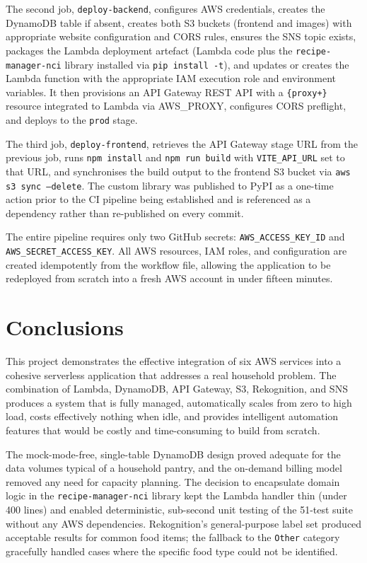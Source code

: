 \documentclass[conference]{IEEEtran}
\begin{document}
The second job, \texttt{deploy-backend}, configures AWS credentials, creates the DynamoDB table if absent, creates both S3 buckets (frontend and images) with appropriate website configuration and CORS rules, ensures the SNS topic exists, packages the Lambda deployment artefact (Lambda code plus the \texttt{recipe-manager-nci} library installed via \texttt{pip install -t}), and updates or creates the Lambda function with the appropriate IAM execution role and environment variables. It then provisions an API Gateway REST API with a \texttt{\{proxy+\}} resource integrated to Lambda via AWS\_PROXY, configures CORS preflight, and deploys to the \texttt{prod} stage.

The third job, \texttt{deploy-frontend}, retrieves the API Gateway stage URL from the previous job, runs \texttt{npm install} and \texttt{npm run build} with \texttt{VITE\_API\_URL} set to that URL, and synchronises the build output to the frontend S3 bucket via \texttt{aws s3 sync --delete}. The custom library was published to PyPI as a one-time action prior to the CI pipeline being established and is referenced as a dependency rather than re-published on every commit.

The entire pipeline requires only two GitHub secrets: \texttt{AWS\_ACCESS\_KEY\_ID} and \texttt{AWS\_SECRET\_ACCESS\_KEY}. All AWS resources, IAM roles, and configuration are created idempotently from the workflow file, allowing the application to be redeployed from scratch into a fresh AWS account in under fifteen minutes.

\section{Conclusions}

This project demonstrates the effective integration of six AWS services into a cohesive serverless application that addresses a real household problem. The combination of Lambda, DynamoDB, API Gateway, S3, Rekognition, and SNS produces a system that is fully managed, automatically scales from zero to high load, costs effectively nothing when idle, and provides intelligent automation features that would be costly and time-consuming to build from scratch.

The mock-mode-free, single-table DynamoDB design proved adequate for the data volumes typical of a household pantry, and the on-demand billing model removed any need for capacity planning. The decision to encapsulate domain logic in the \texttt{recipe-manager-nci} library kept the Lambda handler thin (under 400 lines) and enabled deterministic, sub-second unit testing of the 51-test suite without any AWS dependencies. Rekognition's general-purpose label set produced acceptable results for common food items; the fallback to the \texttt{Other} category gracefully handled cases where the specific food type could not be identified.
\end{document}
